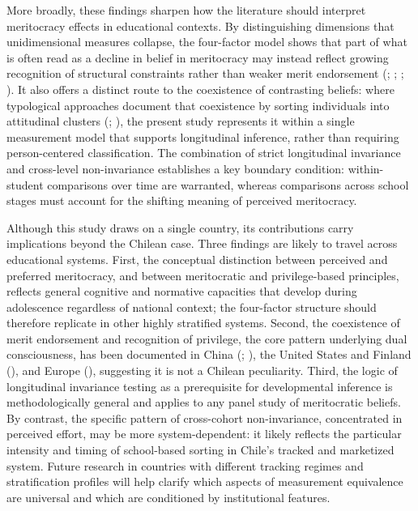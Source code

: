 \documentclass[
  13pt,
]{article}
\begin{document}
More broadly, these findings sharpen how the literature should interpret
meritocracy effects in educational contexts. By distinguishing
dimensions that unidimensional measures collapse, the four-factor model
shows that part of what is often read as a decline in belief in
meritocracy may instead reflect growing recognition of structural
constraints rather than weaker merit endorsement
(;
;
;
). It also offers a
distinct route to the coexistence of contrasting beliefs: where
typological approaches document that coexistence by sorting individuals
into attitudinal clusters
(;
), the present study
represents it within a single measurement model that supports
longitudinal inference, rather than requiring person-centered
classification. The combination of strict longitudinal invariance and
cross-level non-invariance establishes a key boundary condition:
within-student comparisons over time are warranted, whereas comparisons
across school stages must account for the shifting meaning of perceived
meritocracy.

Although this study draws on a single country, its contributions carry
implications beyond the Chilean case. Three findings are likely to
travel across educational systems. First, the conceptual distinction
between perceived and preferred meritocracy, and between meritocratic
and privilege-based principles, reflects general cognitive and normative
capacities that develop during adolescence regardless of national
context; the four-factor structure should therefore replicate in other
highly stratified systems. Second, the coexistence of merit endorsement
and recognition of privilege, the core pattern underlying dual
consciousness, has been documented in China
(;
), the United
States and Finland (),
and Europe (), suggesting it is not a Chilean peculiarity. Third, the
logic of longitudinal invariance testing as a prerequisite for
developmental inference is methodologically general and applies to any
panel study of meritocratic beliefs. By contrast, the specific pattern
of cross-cohort non-invariance, concentrated in perceived effort, may be
more system-dependent: it likely reflects the particular intensity and
timing of school-based sorting in Chile's tracked and marketized system.
Future research in countries with different tracking regimes and
stratification profiles will help clarify which aspects of measurement
equivalence are universal and which are conditioned by institutional
features.
\end{document}
